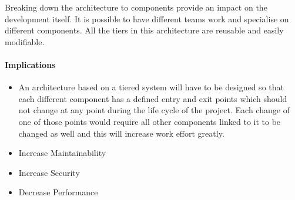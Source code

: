 	Breaking down the architecture to components provide an impact on the development itself. It is possible to have different teams work and specialise on different components. All the tiers in this architecture are reusable and easily modifiable. 


\paragraph{Implications}
\begin{itemize}
	\item 
	An architecture based on a tiered system will have to be designed so that each different component has a defined entry and exit points which should not change at any point during the life cycle of the project. Each change of one of those points would require all other components linked to it to be changed as well and this will increase work effort greatly.

	\item Increase Maintainability
	\item Increase Security
	\item Decrease Performance
\end{itemize}
